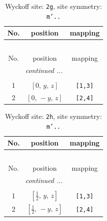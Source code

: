 \documentclass[fleqn,8pt]{jsarticle}
\begin{document}
\renewcommand{\arraystretch}{1.2}
\begin{longtable}{ccc}
\caption{Wyckoff site: {\tt 2g}, site symmetry: {\tt m'..}}
 \\
 \hline \hline
No. & position & mapping \\ \hline \endfirsthead

\multicolumn{2}{l}{\tablename\ \thetable{}} \\
 \hline \hline
No. & position & mapping \\ \hline \endhead

 \hline \hline
\multicolumn{2}{r}{\footnotesize\it continued ...} \\ \endfoot

 \hline \hline
\multicolumn{2}{r}{} \\ \endlastfoot

1 & $\left[ 0,\, y,\, z \right]$ & {\tt [1,3]} \\ \hline
2 & $\left[ 0,\, - y,\, z \right]$ & {\tt [2,4]} \\
\end{longtable}
\renewcommand{\arraystretch}{1.2}
\begin{longtable}{ccc}
\caption{Wyckoff site: {\tt 2h}, site symmetry: {\tt m'..}}
 \\
 \hline \hline
No. & position & mapping \\ \hline \endfirsthead

\multicolumn{2}{l}{\tablename\ \thetable{}} \\
 \hline \hline
No. & position & mapping \\ \hline \endhead

 \hline \hline
\multicolumn{2}{r}{\footnotesize\it continued ...} \\ \endfoot

 \hline \hline
\multicolumn{2}{r}{} \\ \endlastfoot

1 & $\left[ \frac{1}{2},\, y,\, z \right]$ & {\tt [1,3]} \\ \hline
2 & $\left[ \frac{1}{2},\, - y,\, z \right]$ & {\tt [2,4]} \\
\end{longtable}
\renewcommand{\arraystretch}{1.2}
\end{document}
